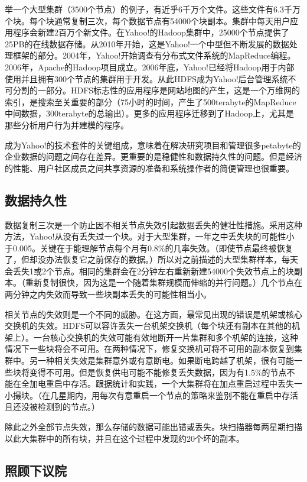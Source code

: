 举一个大型集群（3500个节点）的例子，有近乎6千万个文件。这些文件有6.3千万个块。每个块通常复制三次，每个数据节点有54000个块副本。集群中每天用户应用程序会新建2百万个新文件。在Yahoo!的Hadoop集群中，25000个节点提供了25PB的在线数据存储。从2010年开始，这是Yahoo!一个中型但不断发展的数据处理框架的部分。2004年，Yahoo!开始调查有分布式文件系统的MapReduce编程。2006年，Apache的Hadoop项目成立。2006年底，Yahoo!已经将Hadoop用于内部使用并且拥有300个节点的集群用于开发。从此HDFS成为Yahoo!后台管理系统不可分割的一部分。HDFS标志性的应用程序是网站地图的产生，这是一个万维网的索引，是搜索至关重要的部分（75小时的时间，产生了500terabyte的MapReduce中间数据，300terabyte的总输出）。更多的应用程序迁移到了Hadoop上，尤其是那些分析用户行为并建模的程序。

成为Yahoo!的技术套件的关键组成，意味着在解决研究项目和管理很多petabyte的企业数据的问题之间存在差异。更重要的是稳健性和数据持久性的问题。但是经济的性能、用户社区成员之间共享资源的准备和系统操作者的简便管理也很重要。

\subsection{数据持久性}

数据复制三次是一个防止因不相关节点失效引起数据丢失的健壮性措施。采用这种方法，Yahoo!从没有丢失过一个块。对于大型集群，一年之中丢失块的可能性小于0.005。关键在于能理解节点每个月有0.8\%的几率失效。（即使节点最终被恢复了，但却没办法恢复它之前保存的数据。）所以对之前描述的大型集群样本，每天会丢失1或2个节点。相同的集群会在2分钟左右重新新建54000个失效节点上的块副本。（重新复制很快，因为这是一个随着集群规模而伸缩的并行问题。）几个节点在两分钟之内失效而导致一些块副本丢失的可能性相当小。

相关节点的失效则是一个不同的威胁。在这方面，最常见出现的错误是机架或核心交换机的失效。HDFS可以容许丢失一台机架交换机（每个块还有副本在其他的机架上）。一台核心交换机的失效可能有效地断开一片集群和多个机架的连接，这种情况下一些块将会不可用。在两种情况下，修复交换机可将不可用的副本恢复到集群中。另一种相关失效是集群意外或有意断电。如果断电跨越了机架，很有可能一些块将变得不可用。但是恢复供电可能不能修复丢失数据，因为有1.5\%的节点不能在全加电重启中存活。跟据统计和实践，一个大集群将在加点重启过程中丢失一小撮块。（在几星期内，用每次有意重启一个节点的策略来鉴别不能在重启中存活且还没被检测到的节点。）

除此之外全部节点失效，那么存储的数据可能出错或丢失。块扫描器每两星期扫描以此大集群中的所有块，并且在这个过程中发现约20个坏的副本。

\subsection{照顾下议院}


